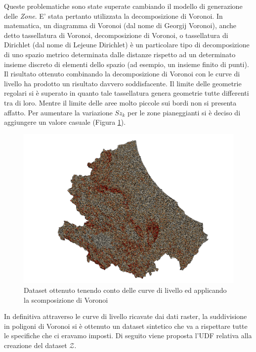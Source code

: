 Queste problematiche sono state superate cambiando il modello di generazione delle \textit{Zone}. E' stata pertanto utilizzata la decomposizione di Voronoi. In matematica, un diagramma di Voronoi (dal nome di Georgij Voronoi), anche detto tassellatura di Voronoi, decomposizione di Voronoi, o tassellatura di Dirichlet (dal nome di Lejeune Dirichlet) è un particolare tipo di decomposizione di uno spazio metrico determinata dalle distanze rispetto ad un determinato insieme discreto di elementi dello spazio (ad esempio, un insieme finito di punti). 
Il risultato ottenuto combinando la decomposizione di Voronoi con le curve di livello ha prodotto un risultato davvero soddisfacente. Il limite delle geometrie regolari si è superato in quanto tale tassellatura genera geometrie tutte differenti tra di loro. Mentre il limite delle aree molto piccole sui bordi non si presenta affatto.
Per aumentare la variazione $Sz_k$ per le zone pianeggianti si è deciso di aggiungere un valore casuale (Figura \ref{fig:final_dataset_it_3}).

\begin{figure}[h]
	\centering
	\includegraphics[width=1\textwidth]{images/voronoi.png}
	\caption{Dataset ottenuto tenendo conto delle curve di livello ed applicando la scomposizione di Voronoi}
	\label{fig:final_dataset_it_3}
\end{figure}

In definitiva attraverso le curve di livello ricavate dai dati raster, la suddivisione in poligoni di Voronoi si è ottenuto un dataset sintetico che va a rispettare tutte le specifiche che ci eravamo imposti. Di seguito viene proposta l'UDF relativa alla creazione del dataset $\mathcal{Z}$.

